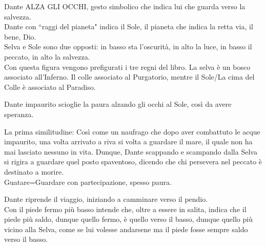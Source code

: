 \documentclass{article}
\begin{document}
Dante ALZA GLI OCCHI, gesto simbolico che indica lui che guarda verso la salvezza.\\
Dante con ``raggi del pianeta" indica il Sole, il pianeta che indica la retta via, il bene, Dio.\\
Selva e Sole sono due opposti: in basso sta l'oscurità, in alto la luce, in basso il peccato, in alto la salvezza.\\
Con questa figura vengono prefigurati i tre regni del libro. La selva è un bosco associato all'Inferno. Il colle associato al Purgatorio, mentre il Sole/La cima del Colle è associato al Paradiso.


Dante impaurito scioglie la paura alzando gli occhi al Sole, così da avere speranza.


La prima similitudine: Così come un naufrago che dopo aver combattuto le acque impaurito, una volta arrivato a riva si volta a guardare il mare, il quale non ha mai lasciato nessuno in vita. Dunque, Dante scappando e scampando dalla Selva si rigira a guardare quel posto spaventoso, dicendo che chi persevera nel peccato è destinato a morire.\\
Guatare=Guardare con partecipazione, spesso paura.


Dante riprende il viaggio, iniziando a camminare verso il pendio.\\
Con il piede fermo più basso intende che, oltre a essere in salita, indica che il piede più saldo, dunque quello fermo, è quello verso il basso, dunque quello più vicino alla Selva, come se lui volesse andarsene ma il piede fosse sempre saldo verso il basso.
\end{document}
